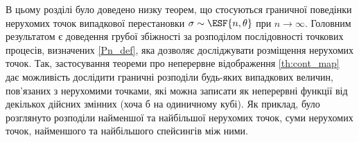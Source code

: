 В цьому розділі було доведено низку теорем,
що стосуються граничної поведінки нерухомих точок
випадкової перестановки $\sigma \sim \ESF{n, \theta}$
при $n \to \infty$. Головним результатом є 
доведення грубої збіжності за розподілом 
послідовності точкових процесів, визначених
\eqref{Pn_def}, яка дозволяє досліджувати
розміщення нерухомих точок. Так, застосування
теореми про неперервне відображення \ref{th:cont_map}
дає можливість дослідити граничні розподіли будь-яких
випадкових величин, пов'язаних з нерухомими точками, 
які можна записати як
неперервні функції від декількох дійсних змінних 
(хоча б на одиничному кубі).
Як приклад, було розглянуто розподіли найменшої та найбільшої
нерухомих точок, суми нерухомих точок, найменшого та найбільшого
спейсингів між ними.